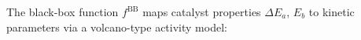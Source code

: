 \documentclass[12pt,a4paper]{article}%
\theoremstyle{plain}%
\theoremstyle{remark}%
\theoremstyle{definition}%
\def\BB{\mathrm{BB}}
\providecommand{\DIFaddbegin}{} %
\providecommand{\DIFdelbegin}{} %
\providecommand{\DIFdelend}{} %
\newcommand{\DIFscaledelfig}{0.5}
\newlength{\DIFdelgraphicswidth} %
\newlength{\DIFdelgraphicsheight} %
\newcommand{\DIFaddincludegraphics}[2][]{{\color{blue}\fbox{\DIFOincludegraphics[#1]{#2}}}} %
\newcommand{\DIFdelincludegraphics}[2][]{%
\sbox{\DIFdelgraphicsbox}{\DIFOincludegraphics[#1]{#2}}%
\settoboxwidth{\DIFdelgraphicswidth}{\DIFdelgraphicsbox} %
\settoboxtotalheight{\DIFdelgraphicsheight}{\DIFdelgraphicsbox} %
\scalebox{\DIFscaledelfig}{%
\parbox[b]{\DIFdelgraphicswidth}{\usebox{\DIFdelgraphicsbox}\\[-\baselineskip] \rule{\DIFdelgraphicswidth}{0em}}\llap{\resizebox{\DIFdelgraphicswidth}{\DIFdelgraphicsheight}{%
\setlength{\unitlength}{\DIFdelgraphicswidth}%
\begin{picture}(1,1)%
\thicklines\linethickness{2pt} %
{\color[rgb]{1,0,0}\put(0,0){\framebox(1,1){}}}%
{\color[rgb]{1,0,0}\put(0,0){\line( 1,1){1}}}%
{\color[rgb]{1,0,0}\put(0,1){\line(1,-1){1}}}%
\end{picture}%
}\hspace*{3pt}}} %
} %
\DeclareRobustCommand{\DIFaddbegin}{\DIFOaddbegin \let\includegraphics\DIFaddincludegraphics} %
\DeclareRobustCommand{\DIFdelbegin}{\DIFOdelbegin \let\includegraphics\DIFdelincludegraphics} %
\DeclareRobustCommand{\DIFdelend}{\DIFOaddend \let\includegraphics\DIFOincludegraphics} %
\begin{document}
\begin{appendices}
The black-box function $f^{\BB}$ maps catalyst properties $\Delta E_a$, $E_b$ to kinetic parameters via a volcano-type activity model:

\DIFdelbegin %
\DIFdelend \DIFaddbegin 




\end{appendices}
\end{document}
